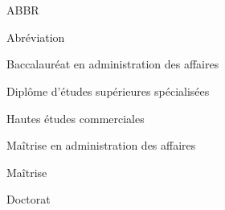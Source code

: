 \chapter*{\HECtdmAbreviations}

\begin{HECabreviations}{ABBR}
\item[ABBR] Abr\'{e}viation
\item[BAA] Baccalaur\'{e}at en administration des affaires
\item[DESS] Dipl\^{o}me d'\'{e}tudes sup\'{e}rieures sp\'{e}cialis\'{e}es
\item[HEC] Hautes \'{e}tudes commerciales
\item[MBA] Ma\^{i}trise en administration des affaires
\item[MSc] Ma\^{i}trise
\item[PhD] Doctorat
\end{HECabreviations}
